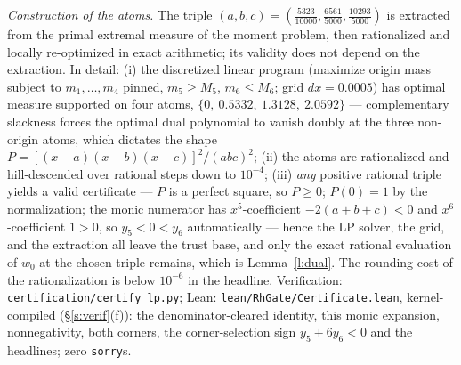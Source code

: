 \documentclass[11pt]{article}
\numberwithin{equation}{section}
\theoremstyle{definition}
\theoremstyle{remark}
\begin{document}
\emph{Construction of the atoms.} The triple
$(a,b,c)=(\tfrac{5323}{10000},\tfrac{6561}{5000},
\tfrac{10293}{5000})$ is extracted from the primal extremal
measure of the moment problem, then rationalized and locally
re-optimized in exact arithmetic; its validity does not depend
on the extraction. In detail: (i) the discretized linear
program (maximize origin mass subject to $m_1,\dots,m_4$
pinned, $m_5\ge M_5$, $m_6\le M_6$; grid $dx=0.0005$) has
optimal measure supported on four atoms,
$\{0,\ 0.5332,\ 1.3128,\ 2.0592\}$ ---
complementary slackness forces the optimal dual polynomial to
vanish doubly at the three non-origin atoms, which dictates the
shape $P=[(x-a)(x-b)(x-c)]^{2}/(abc)^{2}$; (ii) the atoms are
rationalized and hill-descended over rational steps down to
$10^{-4}$; (iii) \emph{any} positive rational triple
yields a valid certificate --- $P$ is a perfect square, so
$P\ge0$; $P(0)=1$ by the normalization; the monic numerator has
$x^{5}$-coefficient $-2(a{+}b{+}c)<0$ and $x^{6}$-coefficient
$1>0$, so $y_5<0<y_6$ automatically --- hence the LP solver, the
grid, and the extraction all leave the trust base, and only the
exact rational evaluation of $w_0$ at the chosen triple remains,
which is Lemma~\ref{l:dual}. The
rounding cost of the rationalization is below $10^{-6}$ in
the headline. Verification:
\texttt{certification/certify\_lp.py}; Lean:
\texttt{lean/RhGate/Certificate.lean}, kernel-compiled
(\S\ref{s:verif}(f)): the denominator-cleared identity, this
monic expansion, nonnegativity, both corners, the
corner-selection sign $y_5+6y_6<0$ and the headlines; zero
\texttt{sorry}s.
\end{document}
